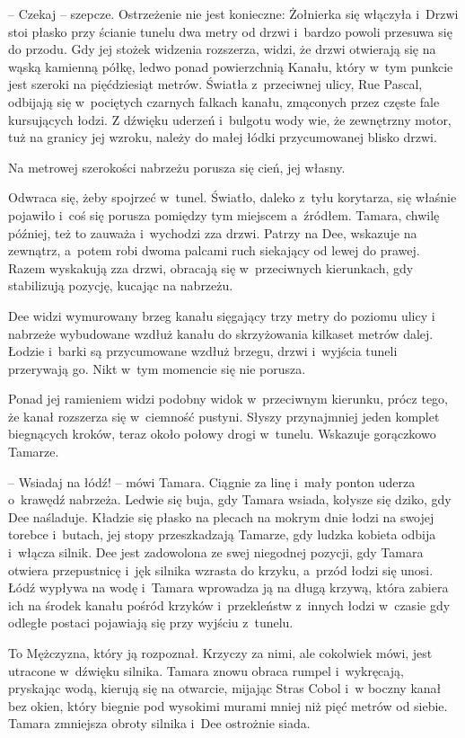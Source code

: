 \documentclass[oneside,polish,11pt,sfheadings]{mwbk}
\begin{document}
-- Czekaj -- szepcze. Ostrzeżenie nie jest konieczne: Żołnierka się
włączyła i~Drzwi stoi płasko przy ścianie tunelu dwa metry od drzwi i~bardzo powoli przesuwa się do przodu. Gdy jej stożek widzenia rozszerza,
widzi, że drzwi otwierają się na wąską kamienną półkę, ledwo ponad
powierzchnią Kanału, który w~tym punkcie jest szeroki na pięćdziesiąt
metrów. Światła z~przeciwnej ulicy, Rue Pascal, odbijają się w~pociętych
czarnych falkach kanału, zmąconych przez częste fale kursujących łodzi.
Z dźwięku uderzeń i~bulgotu wody wie, że zewnętrzny motor, tuż na
granicy jej wzroku, należy do małej łódki przycumowanej blisko drzwi.

Na metrowej szerokości nabrzeżu porusza się cień, jej własny.

Odwraca się, żeby spojrzeć w~tunel. Światło, daleko z~tyłu korytarza,
się właśnie pojawiło i~coś się porusza pomiędzy tym miejscem a~źródłem.
Tamara, chwilę później, też to zauważa i~wychodzi zza drzwi. Patrzy na
Dee, wskazuje na zewnątrz, a~potem robi dwoma palcami ruch siekający od
lewej do prawej. Razem wyskakują zza drzwi, obracają się w~przeciwnych
kierunkach, gdy stabilizują pozycję, kucając na nabrzeżu.

Dee widzi wymurowany brzeg kanału sięgający trzy metry do poziomu ulicy
i nabrzeże wybudowane wzdłuż kanału do skrzyżowania kilkaset metrów
dalej. Łodzie i~barki są przycumowane wzdłuż brzegu, drzwi i~wyjścia
tuneli przerywają go. Nikt w~tym momencie się nie porusza.

Ponad jej ramieniem widzi podobny widok w~przeciwnym kierunku, prócz
tego, że kanał rozszerza się w~ciemność pustyni. Słyszy przynajmniej
jeden komplet biegnących kroków, teraz około połowy drogi w~tunelu.
Wskazuje gorączkowo Tamarze.

-- Wsiadaj na łódź! -- mówi Tamara. Ciągnie za linę i~mały ponton uderza o~krawędź nabrzeża. Ledwie się buja, gdy Tamara wsiada, kołysze się dziko,
gdy Dee naśladuje. Kładzie się płasko na plecach na mokrym dnie łodzi na
swojej torebce i~butach, jej stopy przeszkadzają Tamarze, gdy ludzka
kobieta odbija i~włącza silnik. Dee jest zadowolona ze swej niegodnej
pozycji, gdy Tamara otwiera przepustnicę i~jęk silnika wzrasta do
krzyku, a~przód łodzi się unosi. Łódź wypływa na wodę i~Tamara wprowadza
ją na długą krzywą, która zabiera ich na środek kanału pośród krzyków i~przekleństw z~innych łodzi w~czasie gdy odległe postaci pojawiają się
przy wyjściu z~tunelu.

To Mężczyzna, który ją rozpoznał. Krzyczy za nimi, ale cokolwiek mówi,
jest utracone w~dźwięku silnika. Tamara znowu obraca rumpel i~wykręcają,
pryskając wodą, kierują się na otwarcie, mijając Stras Cobol i~w boczny
kanał bez okien, który biegnie pod wysokimi murami mniej niż pięć metrów
od siebie. Tamara zmniejsza obroty silnika i~Dee ostrożnie siada.
\end{document}
